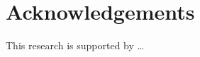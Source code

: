 \documentclass{pbml}
\begin{document}
\section*{Acknowledgements}
This research is supported by \ldots




\correspondingaddress
\end{document}
